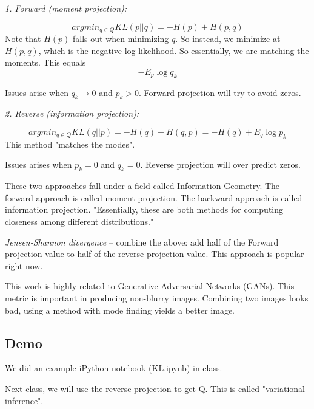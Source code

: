 \documentclass{article}
\begin{document}
\smallskip
\textit{1. Forward (moment projection):}

$$argmin_{q \in Q} KL(p||q) = -H(p) + H(p,q)$$
Note that $H(p)$ falls out when minimizing $q$. So instead, we minimize at $H(p,q)$, which is the negative log likelihood. So essentially, we are matching the moments. This equals $$-E_p \log q_k$$

\smallskip
Issues arise when $q_k \rightarrow 0$ and $p_k >0$. Forward projection will try to avoid zeros.

\smallskip
\smallskip
\textit{2. Reverse (information projection):}

$$argmin_{q \in Q} KL(q||p) = -H(q) + H(q, p) = -H(q) + E_q \log p_k$$
This method "matches the modes".

\smallskip
Issues arises when $p_k = 0$ and $q_k = 0$. Reverse projection will over predict zeros.

\smallskip
These two approaches fall under a field called Information Geometry.
The forward approach is called moment projection. The backward approach is called information projection. "Essentially, these are both methods for computing closeness among different distributions."

\smallskip
 \textit{Jensen-Shannon divergence} -- combine the above: add half of the Forward projection value to half of the reverse projection value. This approach is popular right now. 
 
\smallskip
This work is highly related to Generative Adversarial Networks (GANs). This metric is important in producing non-blurry images. Combining two images looks bad, using a method with mode finding yields a better image.

\subsection{Demo}

\smallskip
We did an example iPython notebook (KL.ipynb) in class.

\smallskip
Next class, we will use the reverse projection to get Q. This is called "variational inference".
\end{document}
